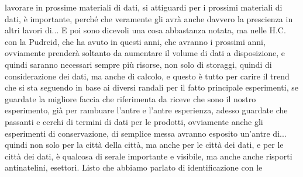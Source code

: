 {lavorare in prossime materiali di dati, si attiguardi per i prossimi materiali di dati, è importante, perché che veramente gli avrà anche davvero la prescienza in altri lavori di... E poi sono dicevoli una cosa abbastanza notata, ma nelle H.C. con la Pudreid, che ha avuto in questi anni, che avranno i prossimi anni, ovviamente prenderà soltanto da aumentare il volume di dati a disposizione, e quindi saranno necessari sempre più risorse, non solo di storaggi, quindi di considerazione dei dati, ma anche di calcolo, e questo è tutto per carire il trend che si sta seguendo in base ai diversi randali per il fatto principale esperimenti, se guardate la migliore faccia che riferimenta da riceve che sono il nostro esperimento, già per rambuare l'antre e l'antre esperienza, adesso guardate che passanti e cerchi di termini di dati per le prodotti, ovviamente anche gli esperimenti di conservazione, di semplice messa avranno esposito un'antre di... quindi non solo per la città della città, ma anche per le città dei dati, e per le città dei dati, è qualcosa di serale importante e visibile, ma anche anche risporti antinatelini, esettori. Listo che abbiamo parlato di identificazione con le

}
